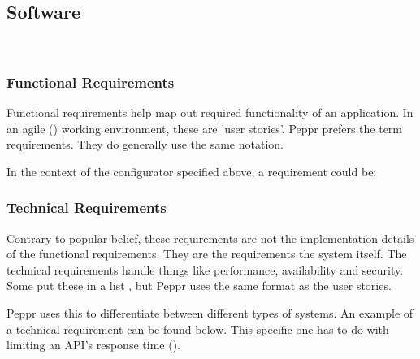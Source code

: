 \subsection{Software}
​
\subsubsection{Functional Requirements}
Functional requirements help map out required functionality of an application. In an agile (\cite{agileUserStories}) working environment, these are 'user stories'. Peppr prefers the term requirements. They do generally use the same notation. \newline

\newline

In the context of the configurator specified above, a requirement could be: \newline

\newline

\subsubsection{Technical Requirements}
Contrary to popular belief, these requirements are not the implementation details of the functional requirements. They are the requirements the system itself. The technical requirements handle things like performance, availability and security. Some put these in a list \cite{agileTechnicalRequirements}, but Peppr uses the same format as the user stories. \newline

\newline

Peppr uses this to differentiate between different types of systems. An example of a technical requirement can be found below. This specific one has to do with limiting an API's response time (\cite{responseTimes}).

